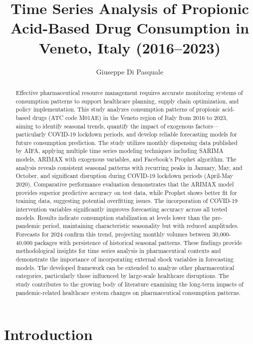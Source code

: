 \documentclass[10pt]{article}
\title{Time Series Analysis of Propionic Acid-Based Drug Consumption in Veneto, Italy (2016--2023)}
\author{Giuseppe Di Pasquale}
\date{}
\begin{document}
\maketitle
\tableofcontents
\newpage


\begin{abstract}
Effective pharmaceutical resource management requires accurate monitoring systems of consumption patterns to support healthcare planning, supply chain optimization, and policy implementation. This study analyzes consumption patterns of propionic acid-based drugs (ATC code M01AE) in the Veneto region of Italy from 2016 to 2023, aiming to identify seasonal trends, quantify the impact of exogenous factors—particularly COVID-19 lockdown periods, and develop reliable forecasting models for future consumption prediction. The study utilizes monthly dispensing data published by AIFA, applying multiple time series modeling techniques including SARIMA models, ARIMAX with exogenous variables, and Facebook's Prophet algorithm. The analysis reveals consistent seasonal patterns with recurring peaks in January, May, and October, and significant disruption during COVID-19 lockdown periods (April-May 2020). Comparative performance evaluation demonstrates that the ARIMAX model provides superior predictive accuracy on test data, while Prophet shows better fit for training data, suggesting potential overfitting issues. The incorporation of COVID-19 intervention variables significantly improves forecasting accuracy across all tested models. Results indicate consumption stabilization at levels lower than the pre-pandemic period, maintaining characteristic seasonality but with reduced amplitudes. Forecasts for 2024 confirm this trend, projecting monthly volumes between 30,000-40,000 packages with persistence of historical seasonal patterns. These findings provide methodological insights for time series analysis in pharmaceutical contexts and demonstrate the importance of incorporating external shock variables in forecasting models. The developed framework can be extended to analyze other pharmaceutical categories, particularly those influenced by large-scale healthcare disruptions. The study contributes to the growing body of literature examining the long-term impacts of pandemic-related healthcare system changes on pharmaceutical consumption patterns.
\end{abstract}


\section{Introduction}
\label{sec:introduction}
\end{document}

